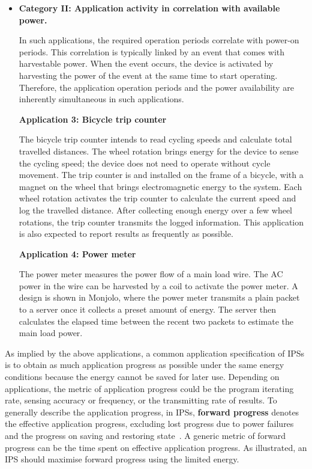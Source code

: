 \begin{itemize}
\item \textbf{Category II: Application activity in correlation with available power.}

In such applications, the required operation periods correlate with power-on periods. 
This correlation is typically linked by an event that comes with harvestable power. 
When the event occurs, the device is activated by harvesting the power of the event at the same time to start operating. 
Therefore, the application operation periods and the power availability are inherently simultaneous in such applications. 

\textbf{Application 3: Bicycle trip counter~\cite{bing2018energy}}

The bicycle trip counter intends to read cycling speeds and calculate total travelled distances. 
The wheel rotation brings energy for the device to sense the cycling speed; the device does not need to operate without cycle movement. 
The trip counter is  and installed on the frame of a bicycle, with a magnet on the wheel that brings electromagnetic energy to the system. 
Each wheel rotation activates the trip counter to calculate the current speed and log the travelled distance. 
After collecting enough energy over a few wheel rotations, the trip counter transmits the logged information. 
This application is also expected to report results as frequently as possible. 

\textbf{Application 4: Power meter~\cite{debruin2013monjolo}}

The power meter measures the power flow of a main load wire. 
The AC power in the wire can be harvested by a coil to activate the power meter. 
A design is shown in Monjolo, where the power meter transmits a plain packet to a server once it collects a preset amount of energy. 
The server then calculates the elapsed time between the recent two packets to estimate the main load power. 

\end{itemize}

As implied by the above applications, a common application specification of IPSs is to obtain as much application progress as possible under the same energy conditions because the energy cannot be saved for later use. 
Depending on applications, the metric of application progress could be the program iterating rate, sensing accuracy or frequency, or the transmitting rate of results. 
To generally describe the application progress, in IPSs, \textbf{forward progress} denotes the effective application progress, excluding lost progress due to power failures and the progress on saving and restoring state~\cite{7478428}.
A generic metric of forward progress can be the time spent on effective application progress. 
As illustrated, an IPS should maximise forward progress using the limited energy. 

